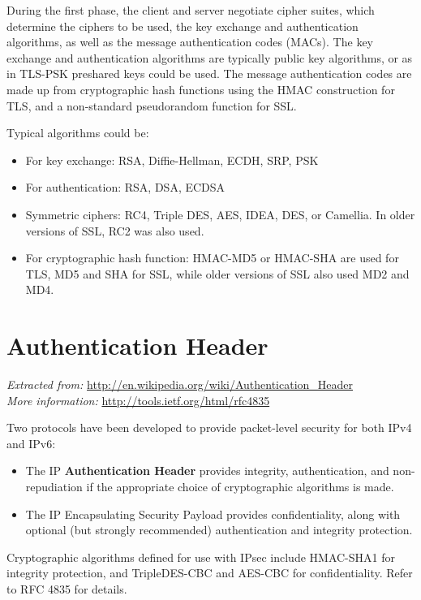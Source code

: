 During the first phase, the client and server negotiate cipher suites, which determine the ciphers to be used, the key exchange and authentication algorithms, as well as the message authentication codes (MACs). The key exchange and authentication algorithms are typically public key algorithms, or as in TLS-PSK preshared keys could be used. The message authentication codes are made up from cryptographic hash functions using the HMAC construction for TLS, and a non-standard pseudorandom function for SSL.

Typical algorithms could be:
\begin{itemize}
\item For key exchange: RSA, Diffie-Hellman, ECDH, SRP, PSK
\item For authentication: RSA, DSA, ECDSA
\item Symmetric ciphers: RC4, Triple DES, AES, IDEA, DES, or Camellia. In older versions of SSL, RC2 was also used.
\item For cryptographic hash function: HMAC-MD5 or HMAC-SHA are used for TLS, MD5 and SHA for SSL, while older versions of SSL also used MD2 and MD4.
\end{itemize}

\section{Authentication Header}
\emph{Extracted from:} \url{http://en.wikipedia.org/wiki/Authentication_Header}\\
\emph{More information:} \url{http://tools.ietf.org/html/rfc4835}

Two protocols have been developed to provide packet-level security for both IPv4 and IPv6:
\begin{itemize}
\item The IP \textbf{Authentication Header} provides integrity, authentication, and non-repudiation if the appropriate choice of cryptographic algorithms is made.
\item The IP Encapsulating Security Payload provides confidentiality, along with optional (but strongly recommended) authentication and integrity protection.
\end{itemize}
Cryptographic algorithms defined for use with IPsec include HMAC-SHA1 for integrity protection, and TripleDES-CBC and AES-CBC for confidentiality. Refer to RFC 4835 for details.


